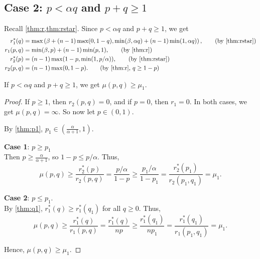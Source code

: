 \subsection{\texorpdfstring{\boldmath}{}Case 2:
    \texorpdfstring{$p < \alpha q$}{p < aq}
    and \texorpdfstring{$p + q \ge 1$}{p + q >= 1}}
\label{sec:case2}

Recall \cref{thm:r,thm:rstar}.
Since $p < \alpha q$ and $p + q \ge 1$, we get
\begin{align*}
r_1^*(q) &= \max\left(\beta + (n-1)\max(0, 1-q), \min(\beta, \alpha q) + (n-1)\min(1, \alpha q)\right),
    \tag{by \cref{thm:rstar}}
\\ r_1(p, q) &= \min(\beta, p) + (n-1)\min(p, 1),
    \tag{by \cref{thm:r}}
\\ r_2^*(p) &= (n-1)\max(1-p, \min(1, p/\alpha)),
    \tag{by \cref{thm:rstar}}
\\ r_2(p, q) &= (n-1)\max(0, 1-p).
    \tag{by \cref{thm:r}, $q \ge 1 - p$}
\end{align*}

\begin{lemma}
\label{thm:2}
If $p < \alpha q$ and $p + q \ge 1$, we get $\mu(p, q) \ge \mu_1$.
\end{lemma}
\begin{proof}
If $p \ge 1$, then $r_2(p, q) = 0$, and if $p = 0$, then $r_1 = 0$.
In both cases, we get $\mu(p, q) = \infty$. So now let $p \in (0, 1)$.

By \cref{thm:p1}, $p_1 \in (\frac{\alpha}{\alpha+1}, 1)$.

\textbf{Case 1}: $p \ge p_1$
\\ Then $p \ge \frac{\alpha}{\alpha+1}$, so $1-p \le p/\alpha$. Thus,
\[ \mu(p, q) \ge \frac{r_2^*(p)}{r_2(p, q)} = \frac{p/\alpha}{1-p}
    \ge \frac{p_1/\alpha}{1-p_1} = \frac{r_2^*(p_1)}{r_2(p_1, q_1)} = \mu_1. \]

\textbf{Case 2}: $p \le p_1$.
\\ By \cref{thm:q1}, $r_1^*(q) \ge r_1^*(q_1)$ for all $q \ge 0$. Thus,
\[ \mu(p, q) \ge \frac{r_1^*(q)}{r_1(p, q)} = \frac{r_1^*(q)}{np}
    \ge \frac{r_1^*(q_1)}{np_1} = \frac{r_1^*(q_1)}{r_1(p_1, q_1)} = \mu_1. \]

Hence, $\mu(p, q) \ge \mu_1$.
\end{proof}

